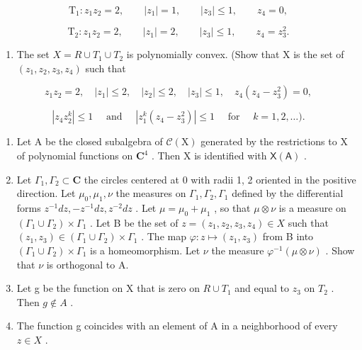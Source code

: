\[
\mathrm{T} _ {1} \colon z _ {1} z _ {2} = 2, \qquad | z _ {1} | = 1, \qquad | z _ {3} | \leqslant 1, \qquad z _ {4} = 0,
\]

\[
\mathrm{T} _ {2} \colon z _ {1} z _ {2} = 2, \qquad | z _ {1} | = 2, \qquad | z _ {3} | \leqslant 1, \qquad z _ {4} = z _ {3} ^ {2}.
\]

\begin{enumerate}
\def\labelenumi{\alph{enumi})}
\tightlist
\item
  The set \(X = R \cup T_{1} \cup T_{2}\) is polynomially convex. (Show that X is the set of \((z_{1}, z_{2}, z_{3}, z_{4})\) such that
\end{enumerate}

\[
z _ {1} z _ {2} = 2, \quad | z _ {1} | \leqslant 2, \quad | z _ {2} | \leqslant 2, \quad | z _ {3} | \leqslant 1, \quad z _ {4} (z _ {4} - z _ {3} ^ {2}) = 0,
\]

\[
| z _ {4} z _ {2} ^ {k} | \leqslant 1 \quad \text { and } \quad | z _ {1} ^ {k} (z _ {4} - z _ {3} ^ {2}) | \leqslant 1 \quad \text { for } \quad k = 1, 2, \ldots).
\]

\begin{enumerate}
\def\labelenumi{\alph{enumi})}
\setcounter{enumi}{1}
\item
  Let A be the closed subalgebra of \(\mathcal{C}(\mathrm{X})\) generated by the restrictions to X of polynomial functions on \(\mathbf{C}^4\) . Then X is identified with \(\mathsf{X}(\mathsf{A})\) .
\item
  Let \(\Gamma_1, \Gamma_2 \subset \mathbf{C}\) the circles centered at 0 with radii 1, 2 oriented in the positive direction. Let \(\mu_0, \mu_1, \nu\) the measures on \(\Gamma_1, \Gamma_2, \Gamma_1\) defined by the differential forms \(z^{-1} dz, -z^{-1} dz, z^{-2} dz\) . Let \(\mu = \mu_0 + \mu_1\) , so that \(\mu \otimes \nu\) is a measure on \((\Gamma_1 \cup \Gamma_2) \times \Gamma_1\) . Let B be the set of \(z = (z_1, z_2, z_3, z_4) \in X\) such that \((z_1, z_3) \in (\Gamma_1 \cup \Gamma_2) \times \Gamma_1\) . The map \(\varphi: z \mapsto (z_1, z_3)\) from B into \((\Gamma_{1} \cup \Gamma_{2}) \times \Gamma_{1}\) is a homeomorphism. Let \(\nu\) the measure \(\varphi^{-1}(\mu \otimes \nu)\) . Show that \(\nu\) is orthogonal to A.
\item
  Let g be the function on X that is zero on \(R \cup T_{1}\) and equal to \(z_{3}\) on \(T_{2}\) . Then \(g \notin A\) .
\item
  The function g coincides with an element of A in a neighborhood of every \(z \in X\) .
\end{enumerate}

